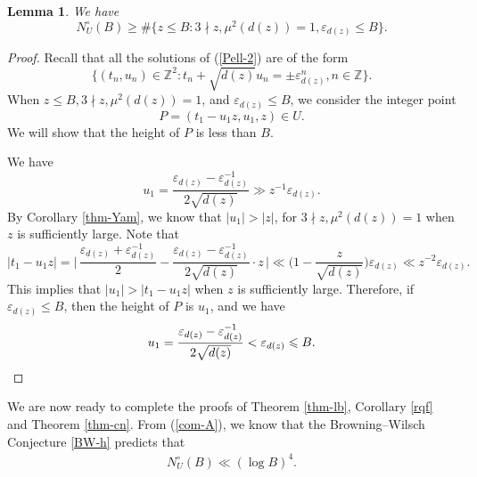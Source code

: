 \documentclass[reqno, 11pt, twoside]{amsart}
\numberwithin{equation}{section}
\newtheorem{lemma}[theorem]{Lemma}
\theoremstyle{definition}
\renewcommand{\leq}{\leqslant}
\renewcommand{\geq}{\geqslant}
\newcommand{\eps}{\varepsilon}
\newcommand{\ZZ}{\mathbb{Z}}
\begin{document}
\begin{lemma}\label{height-func}
	We have
	\begin{equation*}
	N_U^\circ(B) \geq \# \{ z \leq B: 3 \nmid z, \mu^2(d(z)) = 1, \eps_{d(z)} \leq B \}.
\end{equation*}
\end{lemma}
\begin{proof}

Recall that all the solutions of (\ref{Pell-2}) are of the form
$$\{(t_n, u_n) \in \ZZ^2: t_n + \sqrt{d(z)}u_n = \pm \eps_{d(z)}^n, n \in \ZZ\}.$$
When $z \leq B, 3  \nmid  z, \mu^2(d(z)) = 1$, and $  \eps_{d(z)} \leq B$, we consider the integer point  $$P = (t_1 - u_1z, u_1, z) \in U.$$ We will show that the height of $P$ is less than $B$. 

We have 
$$u_1 = \frac{\eps_{d(z)} - \eps^{-1}_{d(z)}}{2 \sqrt{d(z)}} \gg z^{-1} \eps_{d(z)}.$$
By Corollary \ref{thm-Yam}, we know that $|u_1| > |z|$, for $3 \nmid z, \mu^2(d(z)) = 1$ when $z$ is sufficiently large. Note that
$$|t_1 - u_1 z| = \bigg| \, \frac{\eps_{d(z)} + \eps^{-1}_{d(z)}}{2} - \frac{\eps_{d(z)} - \eps^{-1}_{d(z)}}{2 \sqrt{d(z)}} \cdot z \, \bigg| \ll \Big(1 - \frac{z}{\sqrt{d(z)}} \Big) \eps_{d(z)} \ll z^{-2} \eps_{d(z)}.$$
This implies that $|u_1| > |t_1 - u_1 z|$ when $z$ is sufficiently large.
Therefore, if $\eps_{d(z)} \leq B$, then the height of $P$ is $u_1$, and we have 
$$u_1 = \frac{\eps_{d(z)} - \eps^{-1}_{d(z)}}{2 \sqrt{d(z)}} < \eps_{d(z)} \leq B.\vspace{-0.35em}$$ 
\end{proof}


We are now ready to complete the proofs of Theorem \ref{thm-lb}, Corollary \ref{rqf} and Theorem \ref{thm-cn}. From (\ref{com-A}), we know that the Browning--Wilsch Conjecture \ref{BW-h} predicts that 
\begin{eqnarray}\label{BW-h-U}
	N_U^\circ(B) \ll (\log B)^4.
\end{eqnarray}
\end{document}
